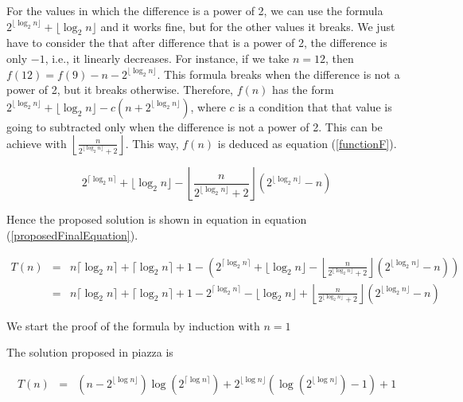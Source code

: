 \documentclass[12pt]{scrartcl}
\begin{document}
\begin{enumerate}
	For the values in which the difference is a power of 2, we can use the formula $2^{\lfloor \log_2 n \rfloor} + \lfloor \log_2 n \rfloor$ and it works fine, but for the other values it breaks. We just have to consider the that after difference that is a power of 2, the difference is only $-1$, i.e., it linearly decreases. For instance, if we take $n = 12$, then $f(12) = f(9) - n - 2^{\lfloor \log_2 n \rfloor}$. This formula breaks when the difference is not a power of 2, but it breaks otherwise. Therefore, $f(n)$ has the form $2^{\lfloor \log_2 n \rfloor} + \lfloor \log_2 n \rfloor -  c\left(n + 2^{\lfloor \log_2 n \rfloor} \right)$, where $c$ is a condition that that value is going to subtracted only when the difference is not a power of 2. This can be achieve with $\left\lfloor \frac{n}{2^{\lfloor \log_2 n \rfloor} + 2} \right\rfloor$. This way, $f(n)$ is deduced as equation (\ref{functionF}).
	
	
	\begin{equation}\label{functionF}
		2^{\lceil \log_2 n \rceil } + \lfloor \log_2 n \rfloor - \left\lfloor \frac{n}{2^{\lfloor \log_2 n \rfloor} + 2} \right\rfloor \left( 2^{\lfloor \log_2 n \rfloor} - n \right)
	\end{equation}
	
	Hence the proposed solution is shown in equation in equation (\ref{proposedFinalEquation}).
	
	\begin{eqnarray}
	T(n) 	&	= 	&	n \lceil \log_2 n \rceil + \lceil \log_2 n \rceil + 1 - \left( 2^{\lceil \log_2 n \rceil } + \lfloor \log_2 n \rfloor - \left\lfloor \frac{n}{2^{\lfloor \log_2 n \rfloor} + 2} \right\rfloor \left( 2^{\lfloor \log_2 n \rfloor} - n \right) \right) \nonumber \\
		&	=	&n \lceil \log_2 n \rceil + \lceil \log_2 n \rceil + 1 -  2^{\lceil \log_2 n \rceil} - \lfloor \log_2 n \rfloor + \left\lfloor \frac{n}{2^{\lfloor \log_2 n \rfloor} + 2} \right\rfloor \left( 2^{\lfloor \log_2 n \rfloor} - n \right)  \label{proposedFinalEquation}
	\end{eqnarray}
	
	We start the proof of the formula by induction with $n = 1$
	
	The solution proposed in piazza is
	
	\begin{eqnarray}
	T(n)  &	=	& \left(n - 2^{\lfloor \log n\rfloor}\right) \log\left( 2^{\lceil \log n \rceil} \right) + 2^{\lfloor \log n \rfloor}\left( \log \left(2^{\lfloor \log n \rfloor} \right) - 1 \right) + 1
	\end{eqnarray}
	

\end{enumerate}
\end{document}

